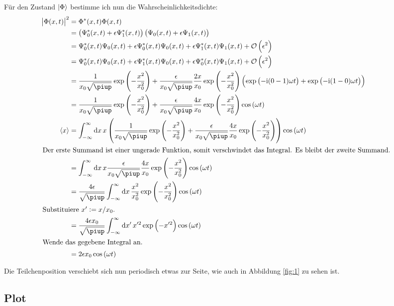 Für den Zustand $\left| \Phi \right\rangle$ bestimme ich nun die Wahrscheinlichkeitsdichte:
\begin{align*}
	\abs{\Phi(x, t)}^2
	&= \Phi^*(x, t) \Phi(x, t) \\
	&= \del{\Psi_0^*(x, t) + \epsilon \Psi_1^*(x, t)} \del{\Psi_0(x, t) + \epsilon \Psi_1(x, t)} \\
	&= \Psi_0^*(x, t) \Psi_0(x, t) + \epsilon \Psi_0^*(x, t) \Psi_0(x, t) + \epsilon \Psi_1^*(x, t) \Psi_1(x, t) + \mathcal O\del{\epsilon^2} \\
	&= \Psi_0^*(x, t) \Psi_0(x, t) + \epsilon \Psi_1^*(x, t) \Psi_0(x, t) + \epsilon \Psi_0^*(x, t) \Psi_1(x, t) + \mathcal O\del{\epsilon^2} \\
	&= \frac{1}{x_0 \sqrt\piup} \exp\del{-\frac{x^2}{x_0^2}} + \frac{\epsilon}{x_0\sqrt\piup} \frac{2x}{x_0} \exp\del{-\frac{x^2}{x_0^2}} \del{\exp\del{-\ii (0-1)\omega t} + \exp\del{-\ii (1-0)\omega t}} \\
	&= \frac{1}{x_0 \sqrt\piup} \exp\del{-\frac{x^2}{x_0^2}} + \frac{\epsilon}{x_0\sqrt\piup} \frac{4x}{x_0} \exp\del{-\frac{x^2}{x_0^2}} \cos\del{\omega t} \\
	\bracket x
	&= \int_{-\infty}^\infty \dif x \, x \del{\frac{1}{x_0 \sqrt\piup} \exp\del{-\frac{x^2}{x_0^2}} + \frac{\epsilon}{x_0\sqrt\piup} \frac{4x}{x_0} \exp\del{-\frac{x^2}{x_0^2}}} \cos\del{\omega t} \\
	\intertext{%
		Der erste Summand ist einer ungerade Funktion, somit verschwindet das
		Integral. Es bleibt der zweite Summand.
	}
	&= \int_{-\infty}^\infty \dif x \, x \frac{\epsilon}{x_0\sqrt\piup} \frac{4x}{x_0} \exp\del{-\frac{x^2}{x_0^2}} \cos\del{\omega t} \\
	&= \frac{4\epsilon}{\sqrt\piup} \int_{-\infty}^\infty \dif x \, \frac{x^2}{x_0^2} \exp\del{-\frac{x^2}{x_0^2}} \cos\del{\omega t} \\
	\intertext{%
		Substituiere $x' := x/x_0$.
	}
	&= \frac{4\epsilon x_0}{\sqrt\piup} \int_{-\infty}^\infty \dif x' \, x'^2 \exp\del{-x'^2} \cos\del{\omega t} \\
	\intertext{%
		Wende das gegebene Integral an.
	}
	&= 2 \epsilon x_0 \cos\del{\omega t}
\end{align*}

Die Teilchenposition verschiebt sich nun periodisch etwas zur Seite, wie auch
in Abbildung \ref{fig:1} zu sehen ist.

\subsection{Plot}

